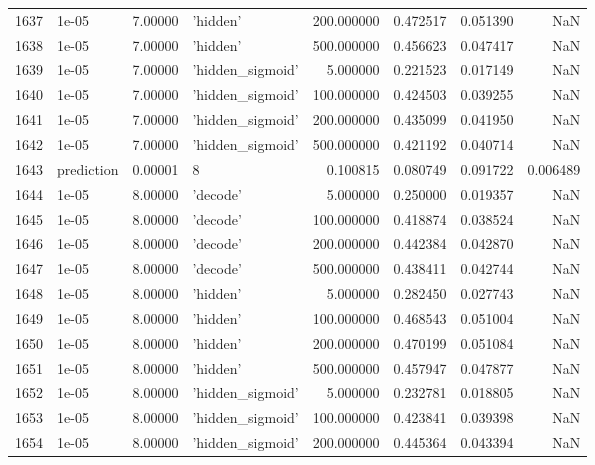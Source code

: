 \documentclass[10pt,a4paper]{article}
\begin{document}
\begin{tabular}{llrlrrrr}
1637 &       1e-05 &   7.00000 &           'hidden' &  200.000000 &  0.472517 &  0.051390 &       NaN \\
1638 &       1e-05 &   7.00000 &           'hidden' &  500.000000 &  0.456623 &  0.047417 &       NaN \\
1639 &       1e-05 &   7.00000 &   'hidden\_sigmoid' &    5.000000 &  0.221523 &  0.017149 &       NaN \\
1640 &       1e-05 &   7.00000 &   'hidden\_sigmoid' &  100.000000 &  0.424503 &  0.039255 &       NaN \\
1641 &       1e-05 &   7.00000 &   'hidden\_sigmoid' &  200.000000 &  0.435099 &  0.041950 &       NaN \\
1642 &       1e-05 &   7.00000 &   'hidden\_sigmoid' &  500.000000 &  0.421192 &  0.040714 &       NaN \\
1643 &  prediction &   0.00001 &                  8 &    0.100815 &  0.080749 &  0.091722 &  0.006489 \\
1644 &       1e-05 &   8.00000 &           'decode' &    5.000000 &  0.250000 &  0.019357 &       NaN \\
1645 &       1e-05 &   8.00000 &           'decode' &  100.000000 &  0.418874 &  0.038524 &       NaN \\
1646 &       1e-05 &   8.00000 &           'decode' &  200.000000 &  0.442384 &  0.042870 &       NaN \\
1647 &       1e-05 &   8.00000 &           'decode' &  500.000000 &  0.438411 &  0.042744 &       NaN \\
1648 &       1e-05 &   8.00000 &           'hidden' &    5.000000 &  0.282450 &  0.027743 &       NaN \\
1649 &       1e-05 &   8.00000 &           'hidden' &  100.000000 &  0.468543 &  0.051004 &       NaN \\
1650 &       1e-05 &   8.00000 &           'hidden' &  200.000000 &  0.470199 &  0.051084 &       NaN \\
1651 &       1e-05 &   8.00000 &           'hidden' &  500.000000 &  0.457947 &  0.047877 &       NaN \\
1652 &       1e-05 &   8.00000 &   'hidden\_sigmoid' &    5.000000 &  0.232781 &  0.018805 &       NaN \\
1653 &       1e-05 &   8.00000 &   'hidden\_sigmoid' &  100.000000 &  0.423841 &  0.039398 &       NaN \\
1654 &       1e-05 &   8.00000 &   'hidden\_sigmoid' &  200.000000 &  0.445364 &  0.043394 &       NaN \\

\end{tabular}
\end{document}

